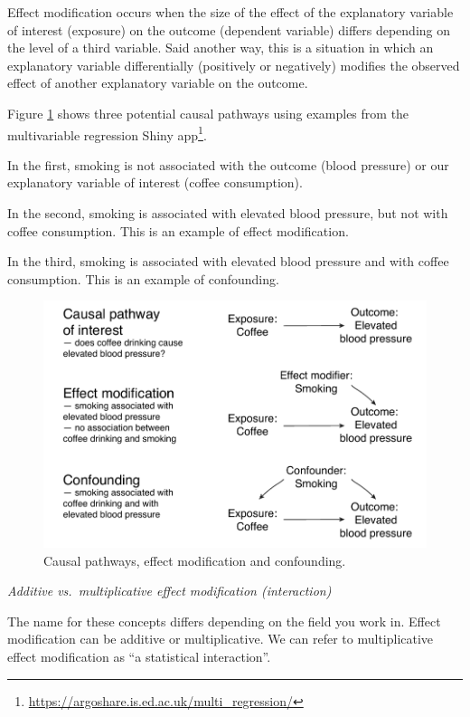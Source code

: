 \documentclass[
  12pt,
  krantz2]{krantz}
\renewcommand{\href}[2]{#2\footnote{\url{#1}}}
\begin{document}
Effect modification occurs when the size of the effect of the explanatory variable of interest (exposure) on the outcome (dependent variable) differs depending on the level of a third variable.
Said another way, this is a situation in which an explanatory variable differentially (positively or negatively) modifies the observed effect of another explanatory variable on the outcome.

Figure \ref{fig:chap07-fig-dags} shows three potential causal pathways using examples from the \href{https://argoshare.is.ed.ac.uk/multi_regression/}{multivariable regression Shiny app}.

In the first, smoking is not associated with the outcome (blood pressure) or our explanatory variable of interest (coffee consumption).

In the second, smoking is associated with elevated blood pressure, but not with coffee consumption.
This is an example of effect modification.

In the third, smoking is associated with elevated blood pressure and with coffee consumption.
This is an example of confounding.

\begin{figure}
\centering
\includegraphics{images/chapter07/5_dags.pdf}
\caption{\label{fig:chap07-fig-dags}Causal pathways, effect modification and confounding.}
\end{figure}

\emph{Additive vs.~multiplicative effect modification (interaction)}

The name for these concepts differs depending on the field you work in.
Effect modification can be additive or multiplicative.
We can refer to multiplicative effect modification as ``a statistical interaction''.
\end{document}
